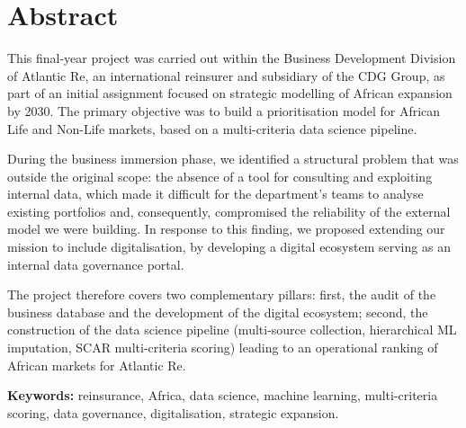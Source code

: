 \documentclass[../main.tex]{subfiles}
\begin{document}
\chapter*{Abstract}

This final-year project was carried out within the Business Development Division of
Atlantic Re, an international reinsurer and subsidiary of the CDG Group, as part of
an initial assignment focused on strategic modelling of African expansion by 2030.
The primary objective was to build a prioritisation model for African Life and
Non-Life markets, based on a multi-criteria data science pipeline.

During the business immersion phase, we identified a structural problem that was
outside the original scope: the absence of a tool for consulting and exploiting
internal data, which made it difficult for the department's teams to analyse existing
portfolios and, consequently, compromised the reliability of the external model we
were building. In response to this finding, we proposed extending our mission to
include digitalisation, by developing a digital ecosystem serving as an internal
data governance portal.

The project therefore covers two complementary pillars: first, the audit of the
business database and the development of the digital ecosystem; second, the
construction of the data science pipeline (multi-source collection, hierarchical ML
imputation, SCAR multi-criteria scoring) leading to an operational ranking of African
markets for Atlantic Re.

\textbf{Keywords:} reinsurance, Africa, data science, machine learning, multi-criteria
scoring, data governance, digitalisation, strategic expansion.

\clearpage

\tableofcontents\clearpage
\listoffigures
{}
\clearpage
\listoftables
{}
\clearpage

\end{document}
